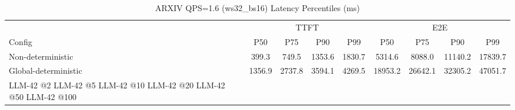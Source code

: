\begin{table}[htbp]
\centering
\caption{ARXIV QPS=1.6 (ws32_bs16) Latency Percentiles (ms)}
\label{tab:arxiv_qps1.6_ws32_bs16}
\begin{tabular}{l|cccc|cccc}
\toprule
& \multicolumn{4}{c|}{TTFT} & \multicolumn{4}{c}{E2E} \\
Config & P50 & P75 & P90 & P99 & P50 & P75 & P90 & P99 \\
\midrule
Non-deterministic & 399.3 & 749.5 & 1353.6 & 1830.7 & 5314.6 & 8088.0 & 11140.2 & 17839.7 \\
Global-deterministic & 1356.9 & 2737.8 & 3594.1 & 4269.5 & 18953.2 & 26642.1 & 32305.2 & 47051.7 \\
LLM-42 @2%
LLM-42 @5%
LLM-42 @10%
LLM-42 @20%
LLM-42 @50%
LLM-42 @100%
\bottomrule
\end{tabular}
\end{table}
